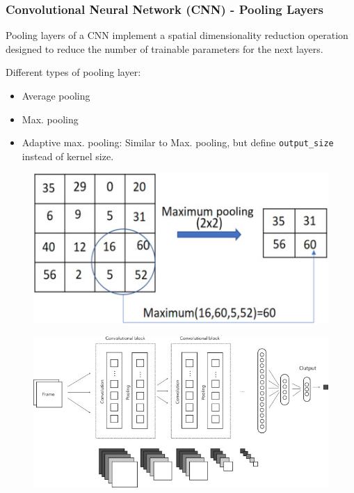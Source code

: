 \documentclass[aspectratio=169, 10pt]{beamer}
\begin{document}
\begin{frame}
    \frametitle{Convolutional Neural Network (CNN) - Pooling Layers}
    \small
    Pooling layers of a CNN implement a spatial dimensionality reduction operation designed to reduce the number of trainable parameters for the next layers.\break

    Different types of pooling layer:
    \begin{itemize}
        \item Average pooling
        \item Max. pooling
        \item Adaptive max. pooling: Similar to Max. pooling, but define \texttt{output\_size} instead of kernel size.
    \end{itemize}

    \begin{figure}
        \centering
        \includegraphics[width=0.27\columnwidth]{../imgs/max_pool.jpg}
    \end{figure}

    \begin{figure}
        \centering
        \includegraphics[width=0.37\columnwidth]{../imgs/image_nn.jpg}
    \end{figure}
\end{frame}

\end{document}
